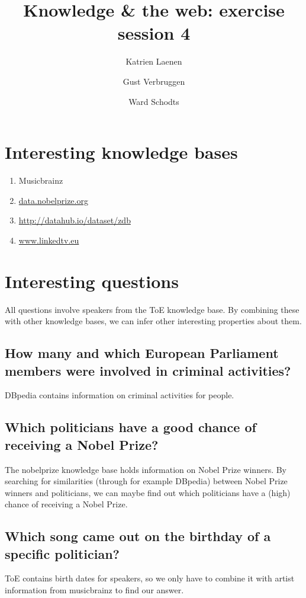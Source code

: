 \documentclass[11pt,a4paper]{article}
\author{
  Katrien Laenen\\
  \and
  Gust Verbruggen\\
  \and
  Ward Schodts
}
\title{Knowledge \& the web: exercise session 4}
\begin{document}
\maketitle
\section{Interesting knowledge bases}
\begin{enumerate}

\item Musicbrainz
\item \url{data.nobelprize.org}
\item \url{http://datahub.io/dataset/zdb}
\item \url{www.linkedtv.eu}

\end{enumerate}

\section{Interesting questions}

All questions involve speakers from the ToE knowledge base. By combining these with other knowledge bases, we can infer other interesting properties about them. 


\subsection{How many and which European Parliament members were involved in criminal activities?}

DBpedia contains information on criminal activities for people.

\subsection{Which politicians have a good chance of receiving a Nobel Prize?}

The nobelprize knowledge base holds information on Nobel Prize winners. By searching for similarities (through for example DBpedia) between Nobel Prize winners and politicians, we can maybe find out which politicians have a (high) chance of receiving a Nobel Prize.

\subsection{Which song came out on the birthday of a specific politician?}

ToE contains birth dates for speakers, so we only have to combine it with artist information from musicbrainz to find our answer.
\end{document}
